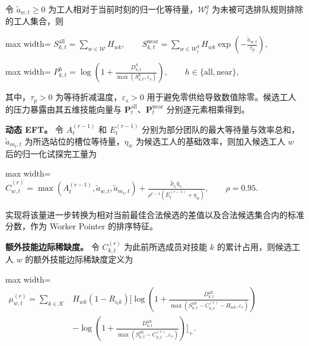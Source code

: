 \documentclass[journal,10pt]{IEEEtran}
\begin{document}
令 \(\widetilde a_{w,t}\ge 0\) 为工人相对于当前时刻的归一化等待量，\(\mathcal W_t^q\) 为未被可选排队规则排除的工人集合，则

\begin{center}
\begin{adjustbox}{max width=\columnwidth}
$\displaystyle
S_{k,t}^{\mathrm{all}}=
\sum_{w\in\mathcal W}H_{wk},
\qquad
S_{k,t}^{\mathrm{near}}=
\sum_{w\in\mathcal W_t^q}
H_{wk}\exp\!\left(-\frac{\widetilde a_{w,t}}{\tau_p}\right),
$
\end{adjustbox}
\end{center}

\begin{center}
\begin{adjustbox}{max width=\columnwidth}
$\displaystyle
P_{k,t}^{h}=
\log\!\left(
1+\frac{D_{k,t}^{h}}{\max(S_{k,t}^{h},\varepsilon_s)}
\right),
\qquad h\in\{\mathrm{all},\mathrm{near}\},
$
\end{adjustbox}
\end{center}

其中，\(\tau_p>0\) 为等待折减温度，\(\varepsilon_s>0\) 用于避免零供给导致数值除零。候选工人的压力暴露由其五维技能向量与 \(\mathbf P_t^{\mathrm{all}}\)、\(\mathbf P_t^{\mathrm{near}}\) 分别逐元素相乘得到。

\textbf{动态 EFT。} 令 \(A_t^{(r-1)}\) 和 \(E_t^{(r-1)}\) 分别为部分团队的最大等待量与效率总和，\(\widetilde a_{m_t,t}\) 为所选站位的槽位等待量，\(\eta_w\) 为候选工人的基础效率，则加入候选工人 \(w\) 后的归一化试探完工量为

\begin{center}
\begin{adjustbox}{max width=\columnwidth}
$\displaystyle
\widehat C_{w,t}^{(r)}=
\max\!\left(
A_t^{(r-1)},\widetilde a_{w,t},\widetilde a_{m_t,t}
\right)
+\frac{\widetilde p_{i_t}q_{i_t}}
{\rho^{r-1}\left(E_t^{(r-1)}+\eta_w\right)},
\qquad \rho=0.95.
$
\end{adjustbox}
\end{center}

实现将该量进一步转换为相对当前最佳合法候选的差值以及合法候选集合内的标准分数，作为 Worker Pointer 的排序特征。

\textbf{额外技能边际稀缺度。} 令 \(C_{k,t}^{(r)}\) 为此前所选成员对技能 \(k\) 的累计占用，则候选工人 \(w\) 的额外技能边际稀缺度定义为

\begin{center}
\begin{adjustbox}{max width=\columnwidth}
$\displaystyle
\begin{aligned}
\mu_{w,t}^{(r)}=
\sum_{k\in\mathcal K}{}&H_{wk}(1-R_{i_tk})
\Bigg[
\log\!\left(
1+\frac{D_{k,t}^{\mathrm{all}}}
{\max(S_{k,t}^{\mathrm{all}}-C_{k,t}^{(r)}-H_{wk},\varepsilon_s)}
\right)\\
&-\log\!\left(
1+\frac{D_{k,t}^{\mathrm{all}}}
{\max(S_{k,t}^{\mathrm{all}}-C_{k,t}^{(r)},\varepsilon_s)}
\right)
\Bigg]_{+}.
\end{aligned}
$
\end{adjustbox}
\end{center}
\end{document}
